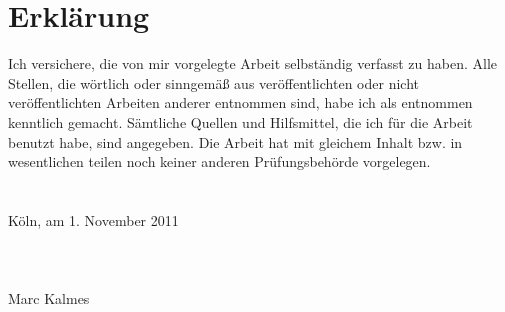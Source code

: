 \mainmatter



%
\appendix

\backmatter

\printbibliography[]

\chapter*{Erklärung}
Ich versichere, die von mir vorgelegte Arbeit selbständig verfasst zu haben. Alle Stellen, die wörtlich oder sinngemäß
 aus veröffentlichten oder nicht veröffentlichten Arbeiten anderer entnommen sind, habe ich als entnommen kenntlich
 gemacht. Sämtliche Quellen und Hilfsmittel, die ich für die Arbeit benutzt habe, sind angegeben. Die Arbeit hat mit
 gleichem Inhalt bzw. in wesentlichen teilen noch keiner anderen Prüfungsbehörde vorgelegen.
\\
\\
\\
Köln, am 1. November 2011
\\
\\
\\
\\
Marc Kalmes

\thispagestyle{empty}
\cleardoublepage

